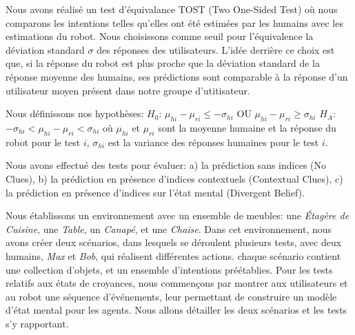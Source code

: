 \documentclass[a4paper,11pt,twoside]{StyleThese}
\begin{document}
Nous avons réalisé un test d'équivalance TOST (Two One-Sided Test) où nous comparons les intentions telles qu'elles ont été estimées par les humains avec les estimations du robot. Nous choisissons comme seuil pour l'équivalence la déviation standard $\sigma$ des réponses des utilisateurs. L'idée derrière ce choix est que, si la réponse du robot est plus proche que la déviation standard de la réponse moyenne des humains, ses prédictions sont comparable à la réponse d'un utilisateur moyen présent dans notre groupe d'utitisateur. 

Nous définissons nos hypothèses:
$H_0$: $\mu_{hi}-\mu_{ri}\leq-\sigma_{hi}$ OU $\mu_{hi}-\mu_{ri}\geq\sigma_{hi}$
$H_A$: $-\sigma_{hi}<\mu_{hi}-\mu_{ri}<\sigma_{hi}$
où $\mu_{hi}$ et $\mu_{ri}$ sont la moyenne humaine et la réponse du robot pour le test $i$, $\sigma_{hi}$ est la variance des réponses humaines pour le test $i$.

Nous avons effectué des tests pour évaluer: a) la prédiction sans indices (No Clues), b) la prédiction en présence d'indices contextuels (Contextual Clues), c) la prédiction en présence d'indices sur l'état mental (Divergent Belief).

Nous établissons un environnement avec un ensemble de meubles: une \textit{Étagère de Cuisine}, une \textit{Table}, un \textit{Canapé}, et une \textit{Chaise}. Dans cet environnement, nous avons créer deux scénarios, dans lesquels se déroulent plusieurs tests, avec deux humains, \textit{Max} et \textit{Bob}, qui réalisent différentes actions. chaque scénario contient une collection d'objets, et un ensemble d'intentions préétablies. Pour les tests relatifs aux états de croyances, nous commençons par montrer aux utilisateurs et au robot une séquence d'événements, leur permettant de construire un modèle d'état mental pour les agents. Nous allons détailler les deux scénarios et les tests s'y rapportant.
\end{document}
